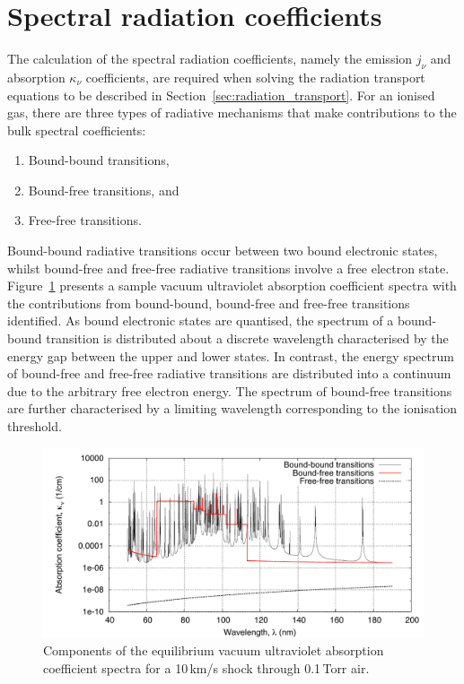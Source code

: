 \section{Spectral radiation coefficients}
\label{sec:spec_rad}

The calculation of the spectral radiation coefficients, namely the emission $j_\nu$ and absorption $\kappa_\nu$ coefficients, are required when solving the radiation transport equations to be described in Section~\ref{sec:radiation_transport}.
For an ionised gas, there are three types of radiative mechanisms that make contributions to the bulk spectral coefficients:

\begin{enumerate}
 \item Bound-bound transitions,
 \item Bound-free transitions, and
 \item Free-free transitions.
\end{enumerate}

Bound-bound radiative transitions occur between two bound electronic states, whilst bound-free and free-free radiative transitions involve a free electron state.
Figure~\ref{fig:sample_absorption_spectra} presents a sample vacuum ultraviolet absorption coefficient spectra with the contributions from bound-bound, bound-free and free-free transitions identified.
As bound electronic states are quantised, the spectrum of a bound-bound transition is distributed about a discrete wavelength characterised by the energy gap between the upper and lower states.
In contrast, the energy spectrum of bound-free and free-free radiative transitions are distributed into a continuum due to the arbitrary free electron energy.
The spectrum of bound-free transitions are further characterised by a limiting wavelength corresponding to the ionisation threshold.

\begin{figure}[h]
 \includegraphics[width=0.9\linewidth]{spectral-modelling/figures/VUV_spectra_components.pdf}
 \caption{Components of the equilibrium vacuum ultraviolet absorption coefficient spectra for a 10\,km/s shock through 0.1\,Torr air.}
 \label{fig:sample_absorption_spectra}
\end{figure}

